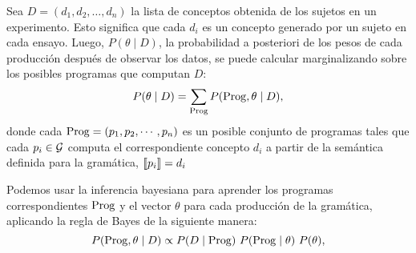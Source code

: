 Sea $D = (d_1, d_2, \dots, d_n)$ la lista de conceptos obtenida de los sujetos en un experimento. Esto significa que cada $d_i$ es un concepto generado por un sujeto en cada ensayo. Luego, $P(\theta \mid D)$, la probabilidad a posteriori de los pesos de cada producción después de observar los datos, se puede calcular marginalizando sobre los posibles programas que computan $D$:
%
\begin{equation*}
\label{eqA}
P(\theta \mid D) = \sum_{\Prog } P(\Prog,\theta \mid D),
\end{equation*} donde cada $\Prog  = (p_1, p_2, \cdots, p_n)$ es un posible conjunto de programas tales que cada $p_i \in \gram$ computa el correspondiente concepto $d_i$ a partir de la semántica definida para la gramática, $\sem{p_i} = d_i$

Podemos usar la inferencia bayesiana para aprender los programas correspondientes $\Prog$ y el vector $\theta$ para cada producción de la gramática, aplicando la regla de Bayes de la siguiente manera:
%
\begin{equation}
\label{eq:mainB}
P(\Prog,\theta \mid D) \propto P(D \mid \Prog)\ P(\Prog \mid \theta)\ P(\theta),
\end{equation}
%


